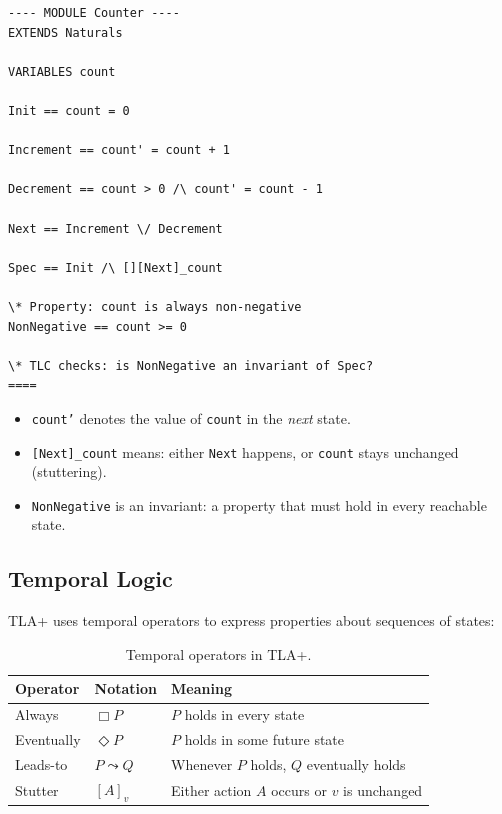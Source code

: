 \documentclass[11pt,a4paper]{article}
\begin{document}
\begin{lstlisting}[language=TLA,caption={A simple counter in TLA+}]
---- MODULE Counter ----
EXTENDS Naturals

VARIABLES count

Init == count = 0

Increment == count' = count + 1

Decrement == count > 0 /\ count' = count - 1

Next == Increment \/ Decrement

Spec == Init /\ [][Next]_count

\* Property: count is always non-negative
NonNegative == count >= 0

\* TLC checks: is NonNegative an invariant of Spec?
====
\end{lstlisting}

\begin{itemize}[nosep]
  \item \texttt{count'} denotes the value of \texttt{count} in the \emph{next} state.
  \item \texttt{[Next]\_count} means: either \texttt{Next} happens, or \texttt{count}
    stays unchanged (stuttering).
  \item \texttt{NonNegative} is an invariant: a property that must hold in every reachable
    state.
\end{itemize}

\subsection{Temporal Logic}

TLA+ uses temporal operators to express properties about sequences of states:

\begin{table}[H]
\centering
\small
\begin{tabular}{@{}lll@{}}
\toprule
\textbf{Operator} & \textbf{Notation} & \textbf{Meaning} \\
\midrule
Always & $\Box P$ & $P$ holds in every state \\
Eventually & $\Diamond P$ & $P$ holds in some future state \\
Leads-to & $P \leadsto Q$ & Whenever $P$ holds, $Q$ eventually holds \\
Stutter & $[A]_v$ & Either action $A$ occurs or $v$ is unchanged \\
\bottomrule
\end{tabular}
\caption{Temporal operators in TLA+.}
\end{table}
\end{document}
